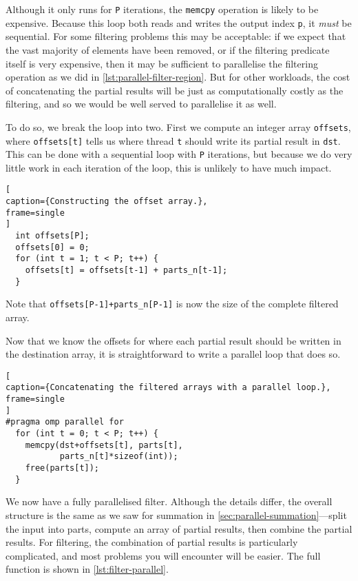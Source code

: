 Although it only runs for \texttt{P} iterations, the \texttt{memcpy}
operation is likely to be expensive. Because this loop both reads and
writes the output index \texttt{p}, it \emph{must} be sequential. For
some filtering problems this may be acceptable: if we expect that the
vast majority of elements have been removed, or if the filtering
predicate itself is very expensive, then it may be sufficient to
parallelise the filtering operation as we did in
\cref{lst:parallel-filter-region}. But for other workloads, the cost
of concatenating the partial results will be just as computationally
costly as the filtering, and so we would be well served to parallelise
it as well.

To do so, we break the loop into two. First we compute an integer
array \texttt{offsets}, where \texttt{offsets[t]} tells us where
thread \texttt{t} should write its partial result in \texttt{dst}.
This can be done with a sequential loop with \texttt{P} iterations,
but because we do very little work in each iteration of the loop, this
is unlikely to have much impact.

\begin{minipage}{\linewidth}
\begin{lstlisting}[
caption={Constructing the offset array.},
frame=single
]
  int offsets[P];
  offsets[0] = 0;
  for (int t = 1; t < P; t++) {
    offsets[t] = offsets[t-1] + parts_n[t-1];
  }
\end{lstlisting}
\end{minipage}

Note that \lstinline{offsets[P-1]+parts_n[P-1]} is now the size of the
complete filtered array.

Now that we know the offsets for where each partial result should be
written in the destination array, it is straightforward to write a
parallel loop that does so.

\begin{lstlisting}[
caption={Concatenating the filtered arrays with a parallel loop.},
frame=single
]
#pragma omp parallel for
  for (int t = 0; t < P; t++) {
    memcpy(dst+offsets[t], parts[t],
           parts_n[t]*sizeof(int));
    free(parts[t]);
  }
\end{lstlisting}

We now have a fully parallelised filter. Although the details differ,
the overall structure is the same as we saw for summation in
\cref{sec:parallel-summation}---split the input into parts, compute an
array of partial results, then combine the partial results. For
filtering, the combination of partial results is particularly
complicated, and most problems you will encounter will be easier. The
full function is shown in \cref{lst:filter-parallel}.

